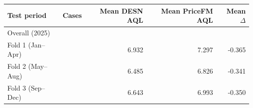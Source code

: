 \begingroup
\TableStyle
\begin{tabular*}{\linewidth}{@{\extracolsep{\fill}}lrrrr@{}}
\toprule
Test period & Cases & Mean DESN AQL & Mean PriceFM AQL & Mean $\Delta$ \\
\midrule
Overall (2025) & \PricefmFullRegionFolds{} & \PricefmFullMeanSelectedAql{} & \PricefmFullMeanPricefmAql{} & \PricefmFullMeanDeltaAql{} \\
Fold 1 (Jan--Apr) & \PricefmFullRegions{} & 6.932 & 7.297 & -0.365 \\
Fold 2 (May--Aug) & \PricefmFullRegions{} & 6.485 & 6.826 & -0.341 \\
Fold 3 (Sep--Dec) & \PricefmFullRegions{} & 6.643 & 6.993 & -0.350 \\
\bottomrule
\end{tabular*}
\endgroup
